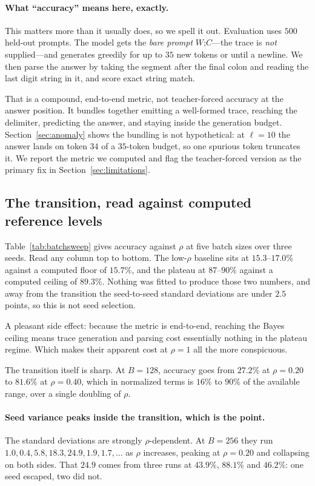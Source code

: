 \documentclass{article}
\theoremstyle{plain}
\theoremstyle{definition}
\theoremstyle{remark}
\newcommand{\1}{\mathbf{1}}
\begin{document}
\paragraph{What ``accuracy'' means here, exactly.}
This matters more than it usually does, so we spell it out. Evaluation uses $500$
held-out prompts. The model gets the \emph{bare prompt} $W\texttt{;}C$---the
trace is \emph{not} supplied---and generates greedily for up to $35$ new tokens
or until a newline. We then parse the answer by taking the segment after the
final colon and reading the last digit string in it, and score exact string
match.

That is a compound, end-to-end metric, not teacher-forced accuracy at the answer
position. It bundles together emitting a well-formed trace, reaching the
delimiter, predicting the answer, and staying inside the generation budget.
Section~\ref{sec:anomaly} shows the bundling is not hypothetical: at $\ell=10$
the answer lands on token $34$ of a $35$-token budget, so one spurious token
truncates it. We report the metric we computed and flag the teacher-forced
version as the primary fix in Section~\ref{sec:limitations}.

\subsection{The transition, read against computed reference levels}

Table~\ref{tab:batchsweep} gives accuracy against $\rho$ at five batch sizes over
three seeds. Read any column top to bottom. The low-$\rho$ baseline sits at
$15.3$--$17.0\%$ against a computed floor of $15.7\%$, and the plateau at
$87$--$90\%$ against a computed ceiling of $89.3\%$. Nothing was fitted to
produce those two numbers, and away from the transition the seed-to-seed standard
deviations are under $2.5$ points, so this is not seed selection.

A pleasant side effect: because the metric is end-to-end, reaching the Bayes
ceiling means trace generation and parsing cost essentially nothing in the
plateau regime. Which makes their apparent cost at $\rho=1$ all the more
conspicuous.

The transition itself is sharp. At $B=128$, accuracy goes from $27.2\%$ at
$\rho=0.20$ to $81.6\%$ at $\rho=0.40$, which in normalized terms is $16\%$ to
$90\%$ of the available range, over a single doubling of $\rho$.

\paragraph{Seed variance peaks inside the transition, which is the point.}
The standard deviations are strongly $\rho$-dependent. At $B=256$ they run
$1.0, 0.4, 5.8, 18.3, 24.9, 1.9, 1.7,\dots$ as $\rho$ increases, peaking at
$\rho=0.20$ and collapsing on both sides. That $24.9$ comes from three runs at
$43.9\%$, $88.1\%$ and $46.2\%$: one seed escaped, two did not.
\end{document}
